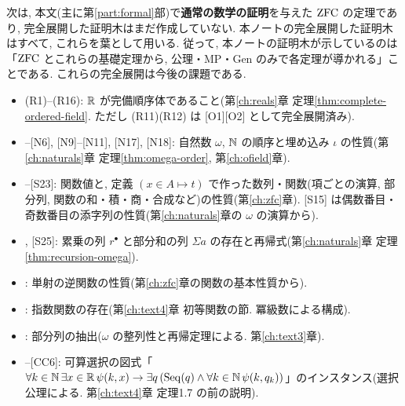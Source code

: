 次は, 本文(主に第\ref{part:formal}部)で\textbf{通常の数学の証明}を与えた $\mathrm{ZFC}$ の定理であり, 完全展開した証明木はまだ作成していない. 本ノートの完全展開した証明木はすべて, これらを葉として用いる. 従って, 本ノートの証明木が示しているのは「$\mathrm{ZFC}$ とこれらの基礎定理から, 公理・MP・Gen のみで各定理が導かれる」ことである. これらの完全展開は今後の課題である.
\begin{itemize}
  \item (R1)--(R16): $\mathbb{R}$ が完備順序体であること(第\ref{ch:reals}章 定理\ref{thm:complete-ordered-field}. ただし (R11)(R12) は [O1][O2] として完全展開済み).
  \item [N3]--[N6], [N9]--[N11], [N17], [N18]: 自然数 $\omega$, $\mathbb{N}$ の順序と埋め込み $\iota$ の性質(第\ref{ch:naturals}章 定理\ref{thm:omega-order}, 第\ref{ch:ofield}章).
  \item [S1]--[S23]: 関数値と, 定義 $(x \in A \mapsto t)$ で作った数列・関数(項ごとの演算, 部分列, 関数の和・積・商・合成など)の性質(第\ref{ch:zfc}章). [S15] は偶数番目・奇数番目の添字列の性質(第\ref{ch:naturals}章の $\omega$ の演算から).
  \item [S24], [S25]: 累乗の列 $r^\bullet$ と部分和の列 $\Sigma a$ の存在と再帰式(第\ref{ch:naturals}章 定理\ref{thm:recursion-omega}).
  \item [S26]: 単射の逆関数の性質(第\ref{ch:zfc}章の関数の基本性質から).
  \item [S27]: 指数関数の存在(第\ref{ch:text4}章 初等関数の節. 冪級数による構成).
  \item [S28]: 部分列の抽出($\omega$ の整列性と再帰定理による. 第\ref{ch:text3}章).
  \item [CC1]--[CC6]: 可算選択の図式「$\forall k \in \mathbb{N}\,\exists x \in \mathbb{R}\,\psi(k, x) \to \exists q\,(\mathrm{Seq}(q) \land \forall k \in \mathbb{N}\,\psi(k, q_k))$」のインスタンス(選択公理による. 第\ref{ch:text4}章 定理1.7 の前の説明).
\end{itemize}

